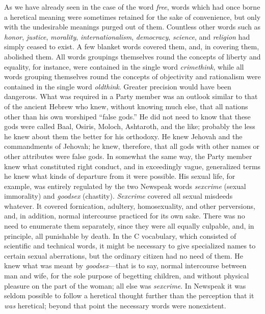 As we have already seen in the case of the word \emph{free}, words which
had once borne a heretical meaning were sometimes retained for the sake
of convenience, but only with the undesirable meanings purged out of
them. Countless other words such as \emph{honor}, \emph{justice},
\emph{morality}, \emph{internationalism}, \emph{democracy},
\emph{science}, and \emph{religion} had simply ceased to exist. A few
blanket words covered them, and, in covering them, abolished them. All
words groupings themselves round the concepts of liberty and equality,
for instance, were contained in the single word \emph{crimethink}, while
all words grouping themselves round the concepts of objectivity and
rationalism were contained in the single word \emph{oldthink}. Greater
precision would have been dangerous. What was required in a Party member
was an outlook similar to that of the ancient Hebrew who knew, without
knowing much else, that all nations other than his own worshiped ``false
gods.'' He did not need to know that these gods were called Baal, Osiris,
Moloch, Ashtaroth, and the like; probably the less he knew about them
the better for his orthodoxy. He knew Jehovah and the commandments of
Jehovah; he knew, therefore, that all gods with other names or other
attributes were false gods. In somewhat the same way, the Party member
knew what constituted right conduct, and in exceedingly vague,
generalized terms he knew what kinds of departure from it were possible.
His sexual life, for example, was entirely regulated by the two Newspeak
words \emph{sexcrime} (sexual immorality) and \emph{goodsex} (chastity).
\emph{Sexcrime} covered all sexual misdeeds whatever. It covered
fornication, adultery, homosexuality, and other perversions, and, in
addition, normal intercourse practiced for its own sake. There was no
need to enumerate them separately, since they were all equally culpable,
and, in principle, all punishable by death. In the C vocabulary, which
consisted of scientific and technical words, it might be necessary to
give specialized names to certain sexual aberrations, but the ordinary
citizen had no need of them. He knew what was meant by
\emph{goodsex}---that is to say, normal intercourse between man and
wife, for the sole purpose of begetting children, and without physical
pleasure on the part of the woman; all else was \emph{sexcrime}. In
Newspeak it was seldom possible to follow a heretical thought further
than the perception that it \emph{was} heretical; beyond that point the
necessary words were nonexistent.

